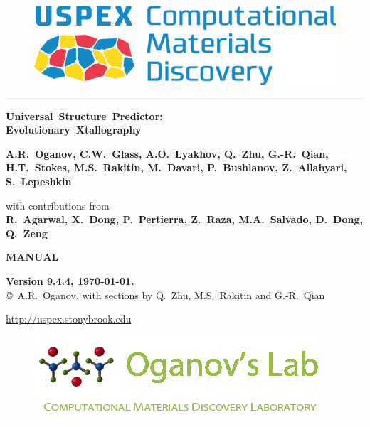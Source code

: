 \documentclass[12pt]{article}
\begin{document}

\begin{titlepage}

\begin{center}

\vspace{2cm}

\begin{figure}[hbtp]
\centering
\includegraphics[scale=0.5]{pic/USPEX_logo.png}
\end{figure}

\vspace{0.5cm}
\hrule
\vspace{0.5cm}

\textbf{%
\vspace{0.5cm}  
\Large Universal~Structure~Predictor: \\
Evolutionary~Xtallography}
\vspace{1.5cm}

\textbf{A.R.~Oganov, C.W.~Glass, A.O.~Lyakhov, Q.~Zhu, G.-R.~Qian, H.T.~Stokes,
M.S.~Rakitin, M.~Davari, P.~Bushlanov, Z.~Allahyari, S.~Lepeshkin}

\vspace{0.5cm}
\vbox{
with contributions from\\
\textbf{R.~Agarwal, X.~Dong, P.~Pertierra, Z.~Raza, M.A.~Salvado, D.~Dong,
Q.~Zeng} }

\vspace{2.0cm}

\textbf{\Large MANUAL}

{\textbf{Version 9.4.4, \today.}
\\
\copyright\  A.R.~Oganov, with sections by Q.~Zhu, M.S.~Rakitin and G.-R.~Qian}

\vspace{2.0cm}

\textcolor{blue}{\url{http://uspex.stonybrook.edu}}

\end{center}

\vspace{1.0cm}
\begin{figure}[hbtp]
\centering
\includegraphics[scale=0.7]{pic/logo_green.png}
\end{figure}

\end{titlepage}
\end{document}

